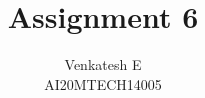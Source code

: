 \documentclass[journal,12pt,twocolumn]{IEEEtran}
\begin{document}
\makeatletter
{}
\makeatother
\let\StandardTheFigure\thefigure
\let\vec\mathbf
\renewcommand{\thefigure}{\theproblem}
\def\putbox#1#2#3{\makebox[0in][l]{\makebox[#1][l]{}\raisebox{\baselineskip}[0in][0in]{\raisebox{#2}[0in][0in]{#3}}}}
     \def\rightbox#1{\makebox[0in][r]{#1}}
     \def\centbox#1{\makebox[0in]{#1}}
     \def\topbox#1{\raisebox{-\baselineskip}[0in][0in]{#1}}
     \def\midbox#1{\raisebox{-0.5\baselineskip}[0in][0in]{#1}}
\vspace{3cm}
\title{Assignment 6}
\author{Venkatesh E\\AI20MTECH14005}
%
%
%
% 
%
\end{document}
